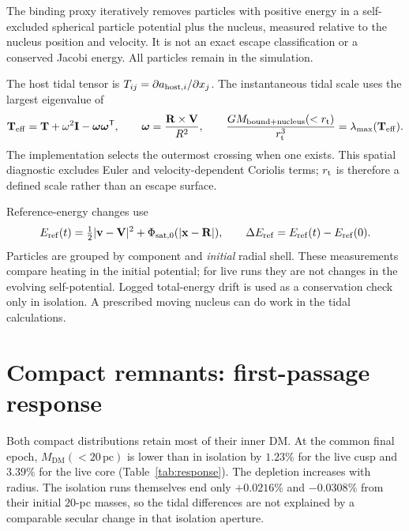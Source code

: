 \documentclass[11pt,a4paper]{article}
\newcommand{\DM}{\mathrm{DM}}
\newcommand{\pc}{\,\mathrm{pc}}
\newcommand{\Mtwenty}{M_{\DM}(<20\pc)}
\begin{document}
The binding proxy iteratively removes particles with positive energy in a
self-excluded spherical particle potential plus the nucleus, measured relative
to the nucleus position and velocity. It is not an exact escape classification
or a conserved Jacobi energy. All particles remain in the simulation.

The host tidal tensor is $T_{ij}=\partial a_{{\rm host},i}/\partial x_j$.
The instantaneous tidal scale uses the largest eigenvalue of
\begin{equation}
 \mathbf T_{\rm eff}=\mathbf T+\omega^2\mathbf I
       -\boldsymbol\omega\boldsymbol\omega^{\mathsf T},\qquad
 \boldsymbol\omega=\frac{\mathbf R\times\mathbf V}{R^2},\qquad
 \frac{G M_{\rm bound+nucleus}(<r_{\rm t})}{r_{\rm t}^3}
       =\lambda_{\max}(\mathbf T_{\rm eff}).
 \label{eq:tidal}
\end{equation}
The implementation selects the outermost crossing when one exists.
This spatial diagnostic excludes Euler and velocity-dependent Coriolis terms;
$r_{\rm t}$ is therefore a defined scale rather than an escape surface.

Reference-energy changes use
\begin{equation}
 E_{\rm ref}(t)=\tfrac12|\mathbf v-\mathbf V|^2+
          \Phi_{\rm sat,0}(|\mathbf x-\mathbf R|),\qquad
 \Delta E_{\rm ref}=E_{\rm ref}(t)-E_{\rm ref}(0).
 \label{eq:energy}
\end{equation}
Particles are grouped by component and \emph{initial} radial shell.
These measurements compare heating in the initial potential; for live runs
they are not changes in the evolving self-potential. Logged total-energy drift
is used as a conservation check only in isolation. A prescribed moving
nucleus can do work in the tidal calculations.

\FloatBarrier
\section{Compact remnants: first-passage response}
\label{sec:remnants}

Both compact distributions retain most of their inner DM. At the common final
epoch, $\Mtwenty$ is lower than in isolation by $1.23\%$ for the live cusp and
$3.39\%$ for the live core (Table~\ref{tab:response}). The depletion increases
with radius. The isolation runs themselves end only $+0.0216\%$ and
$-0.0308\%$ from their initial $20$-pc masses, so the tidal differences are
not explained by a comparable secular change in that isolation aperture.
\end{document}
